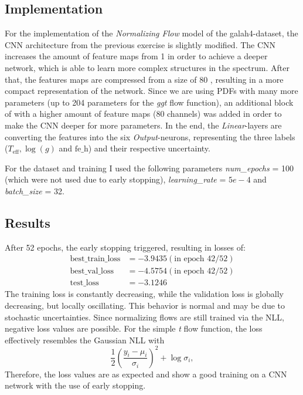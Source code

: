 

\setlength{\parindent}{0em}



\subsection{Implementation}
For the implementation of the \textit{Normalizing Flow} model of the galah4-dataset, the CNN architecture from the previous exercise is slightly modified.
The CNN increases the amount of feature maps from 1     in order to achieve a deeper network, which is able to learn more complex structures in the spectrum.
After that, the features maps are compressed from a size of 80    , resulting in a more compact representation of the network.
Since we are using PDFs with many more parameters (up to 204 parameters for the \textit{ggt} flow function), an additional block of with a higher amount of feature maps (80 channels) was added in order to make the CNN deeper for more parameters.
In the end, the \textit{Linear}-layers are converting the features into the six \textit{Output}-neurons, representing the three labels ($T_\text{eff}, \log(g)$ and $\text{fe\_h}$) and their respective uncertainty.

For the dataset and training I used the following parameters \textit{num\_epochs} = 100 (which were not used due to early stopping), \textit{learning\_rate} = $5e-4$ and \textit{batch\_size} = 32.

\subsection{Results}
After 52 epochs, the early stopping triggered, resulting in losses of:
\begin{align*}
  \text{best\_train\_loss} &= -3.9435 (\text{in epoch 42/52})\\
  \text{best\_val\_loss} &= -4.5754 (\text{in epoch 42/52})\\
  \text{test\_loss} &= -3.1246
\end{align*}
The training loss is constantly decreasing, while the validation loss is globally decreasing, but locally oscillating. This behavior is normal and may be due to stochastic uncertainties.
Since normalizing flows are still trained via the NLL, negative loss values are possible.
For the simple \textit{t} flow function, the loss effectively resembles the Gaussian NLL with
\begin{equation}
  \nonumber
  \frac{1}{2} \left(\frac{y_i - \mu_i}{\sigma_i}\right)^2 + \log{\sigma_i},
\end{equation}
Therefore, the loss values are as expected and show a good training on a CNN network with the use of early stopping.

